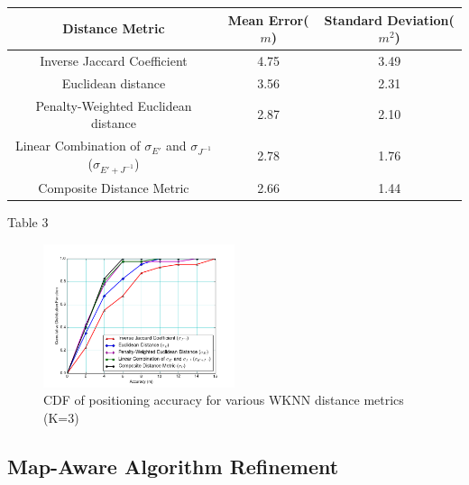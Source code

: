\documentclass[conference]{IEEEtran}
\begin{document}
\begin{minipage}{0.5\columnwidth}
\centering
\begin{tabular}{|c|c|c|}
\hline
Distance Metric 	& Mean Error($m$) & Standard Deviation($m^{2}$) \\
\hline
Inverse Jaccard Coefficient 	& 4.75  & 3.49\\
\hline
Euclidean distance	 & 3.56   & 2.31\\
\hline
Penalty-Weighted Euclidean distance 	& 2.87   & 2.10\\
\hline
Linear Combination of $\sigma_{E'}$ and $\sigma_{J^{-1}}$ ($\sigma_{E' + J^{-1}}$)  	& 2.78   & 1.76\\
\hline
Composite Distance Metric& 2.66   & 1.44\\
\hline

\end{tabular}\par
\bigskip
Table 3
\end{minipage}

\begin{figure}[h!]
  \centering
    \includegraphics[width=0.5\textwidth]{distance_comparison.png}
    \caption{CDF of positioning accuracy for various WKNN distance metrics (K=3)}
\end{figure}


\subsection{Map-Aware Algorithm Refinement}
\end{document}
